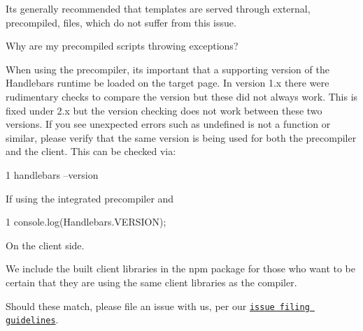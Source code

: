 It\textquotesingle{}s generally recommended that templates are served through external, precompiled, files, which do not suffer from this issue.


\begin{DoxyEnumerate}
\item Why are my precompiled scripts throwing exceptions?

When using the precompiler, it\textquotesingle{}s important that a supporting version of the Handlebars runtime be loaded on the target page. In version 1.\+x there were rudimentary checks to compare the version but these did not always work. This is fixed under 2.\+x but the version checking does not work between these two versions. If you see unexpected errors such as {\ttfamily undefined is not a function} or similar, please verify that the same version is being used for both the precompiler and the client. This can be checked via\+:
\end{DoxyEnumerate}


\begin{DoxyCode}
1 handlebars --version
\end{DoxyCode}
 If using the integrated precompiler and


\begin{DoxyCode}
1 console.log(Handlebars.VERSION);
\end{DoxyCode}
 On the client side.

We include the built client libraries in the npm package for those who want to be certain that they are using the same client libraries as the compiler.

Should these match, please file an issue with us, per our \href{https://github.com/wycats/handlebars.js/blob/master/CONTRIBUTING.md#reporting-issues}{\tt issue filing guidelines}.


